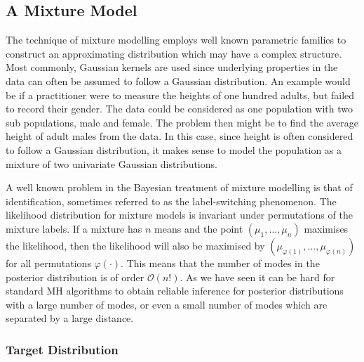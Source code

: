 \documentclass[final]{siamltex}
\begin{document}
\subsection{A Mixture Model}\label{sec:mixture}

The technique of mixture modelling employs well known parametric
families to construct an approximating distribution
which may have a complex structure. Most commonly, Gaussian kernels
are used since underlying properties in the data can often be assumed
to follow a Gaussian distribution. An example would be if a
practitioner were to measure the heights of one hundred adults, but
failed to record their gender. The data could be considered as one
population with two sub populations, male and female. The problem then
might be to find the average height of adult males from the data. In
this case, since height is often considered to follow a Gaussian
distribution, it makes sense to model the population as a mixture of
two univariate Gaussian distributions.

A well known problem in the Bayesian treatment of mixture modelling is
that of identification, sometimes referred to as the label-switching
phenomenon. The likelihood distribution for mixture models is
invariant under permutations of the mixture labels. If a mixture has
$n$ means and the point $(\mu_1, \dots, \mu_n)$ maximises the
likelihood, then the likelihood will also be maximised by
$(\mu_{\varphi(1)}, \dots, \mu_{\varphi(n)})$ for all permutations
$\varphi(\cdot)$. This means that the number of modes in the posterior
distribution is of order $\mathcal{O}(n!)$. As we have seen it can be
hard for standard MH algorithms to obtain reliable inference for
posterior distributions with a large number of modes, or even a small
number of modes which are separated by a large distance.

\subsubsection{Target Distribution}\label{sec:mixture_target}
\end{document}

